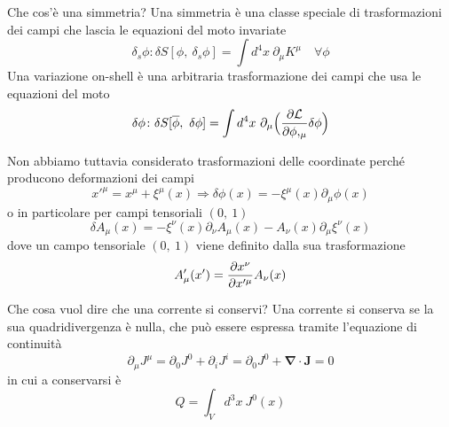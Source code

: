 \begin{frame}{Che cos'è una simmetria?}
    Una simmetria è una classe speciale di trasformazioni dei campi che lascia le equazioni del moto invariate
    \begin{equation*}
        \delta_s \phi \colon \delta S[\phi, ~\delta_s \phi] = \int d^4 x ~ \partial_\mu K^\mu \quad \forall \phi
    \end{equation*}
    Una variazione on-shell è una arbitraria trasformazione dei campi che usa le equazioni del moto
    \begin{equation*}
        \delta \phi \colon \delta S[\overline \phi, ~\delta \phi] = \int d^4 x ~ \partial_\mu \Big ( \frac{\partial\mathcal L}{\partial\phi,_\mu}  \delta \phi \Big) 
    \end{equation*} 
\end{frame}

\begin{frame}
    Non abbiamo tuttavia considerato trasformazioni delle coordinate perché producono deformazioni dei campi
    \begin{equation*}
        x'^\mu = x^\mu + \xi^\mu(x) \Rightarrow \delta \phi(x) = - \xi^\mu(x) \partial_\mu \phi(x)
    \end{equation*}
    o in particolare per campi tensoriali $(0,~1)$ 
    \begin{equation*}
        \delta A_\mu(x) = - \xi^\nu(x) \partial_\nu A_\mu (x) - A_\nu(x) \partial_\mu \xi^\nu(x)
    \end{equation*}
    dove un campo tensoriale $(0, ~1)$ viene definito dalla sua trasformazione
    \begin{equation*}
        A'_\mu(x') = \frac{\partial x^\nu}{\partial x'^\mu} A_\nu(x)
    \end{equation*}
\end{frame}

\begin{frame}{Che cosa vuol dire che una corrente si conservi?}
    Una corrente si conserva se la sua quadridivergenza è nulla, che può essere espressa tramite l'equazione di continuità 
    \begin{equation*}
        \partial_\mu J^\mu = \partial_0 J^0 + \partial_i J^i = \partial_0 J^0 + \boldsymbol \nabla \cdot \mathbf J = 0
    \end{equation*}
    in cui a conservarsi è 
    \begin{equation*}
        Q = \int_V d^3 x ~ J^0(x)
    \end{equation*}  
\end{frame}

